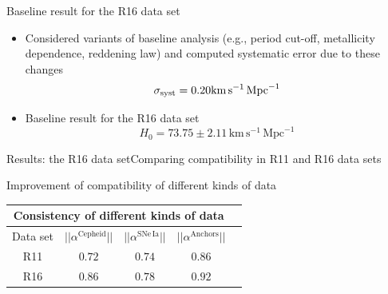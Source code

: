 \documentclass{beamer}
\newcommand{\Cepheid}{\mathrm{Cepheid}}
\newcommand{\Anchors}{\mathrm{Anchors}}
\newcommand{\SNe}{\mathrm{SNe\,Ia}}
\newcommand{\km}{\mathrm{km}}
\newcommand{\second}{\mathrm{s}}
\newcommand{\Mpc}{\mathrm{Mpc}}
\newcommand{\NGC}{\mathrm{NGC4258}}
\begin{document}

\begin{frame}{Baseline result for the R16 data set}
\begin{itemize}
\item[] Considered variants of baseline analysis (e.g., period cut-off, metallicity dependence, reddening law) and computed systematic error due to these changes 
\begin{equation*}
\sigma_{\rm syst}=0.20 \km\, \second^{-1}\, \Mpc^{-1} 
\end{equation*}
\item[] Baseline result for the R16 data set
\begin{equation*}
H_0 = 73.75 \pm 2.11\,\km\, \second^{-1}\, \Mpc^{-1}
\end{equation*}
\end{itemize}
\end{frame}

\begin{frame}{Results: the R16 data set}{Comparing compatibility in R11 and R16 data sets}
\begin{center}
Improvement of compatibility of different kinds of data
\end{center}
\begin{table}[tbp]
\centering
\begin{tabular}{@{}ccccc}
\hline
\multicolumn{4}{c}{Consistency of different kinds of data} \\
\hline
Data set &$|| \alpha^{\Cepheid}||$ & $|| \alpha^{\SNe}||$ & $|| \alpha^{\Anchors}||$ \\
\hline
 R11 &  $ 0.72 $ & $ 0.74 $ & $0.86$  \\
 
 R16 &  $ 0.86 $ & $ 0.78 $ & $0.92$  \\
  

\hline
\end{tabular}
\end{table}
\end{frame}
\end{document}
